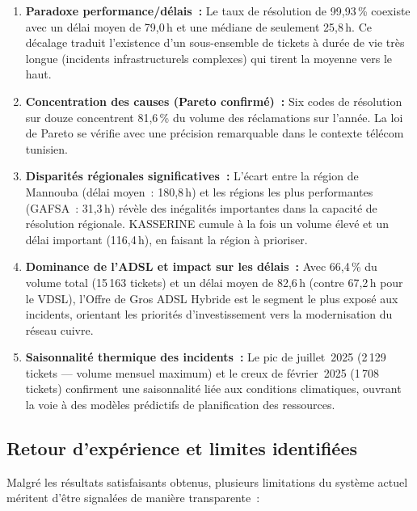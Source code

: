 \documentclass[10pt,a4paper]{report}
\begin{document}
\begin{enumerate}[leftmargin=*, label=\textbf{\arabic*.}, itemsep=8pt]
  \item \textbf{Paradoxe performance/délais~:} Le taux de résolution de 99,93\,\% coexiste avec un délai moyen de 79,0\,h et une médiane de seulement 25,8\,h. Ce décalage traduit l'existence d'un sous-ensemble de tickets à durée de vie très longue (incidents infrastructurels complexes) qui tirent la moyenne vers le haut.

  \item \textbf{Concentration des causes (Pareto confirmé)~:} Six codes de résolution sur douze concentrent 81,6\,\% du volume des réclamations sur l'année. La loi de Pareto se vérifie avec une précision remarquable dans le contexte télécom tunisien.

  \item \textbf{Disparités régionales significatives~:} L'écart entre la région de Mannouba (délai moyen~: 180,8\,h) et les régions les plus performantes (GAFSA~: 31,3\,h) révèle des inégalités importantes dans la capacité de résolution régionale. KASSERINE cumule à la fois un volume élevé et un délai important (116,4\,h), en faisant la région à prioriser.

  \item \textbf{Dominance de l'ADSL et impact sur les délais~:} Avec 66,4\,\% du volume total (15\,163 tickets) et un délai moyen de 82,6\,h (contre 67,2\,h pour le VDSL), l'Offre de Gros ADSL Hybride est le segment le plus exposé aux incidents, orientant les priorités d'investissement vers la modernisation du réseau cuivre.

  \item \textbf{Saisonnalité thermique des incidents~:} Le pic de juillet~2025 (2\,129 tickets --- volume mensuel maximum) et le creux de février~2025 (1\,708 tickets) confirment une saisonnalité liée aux conditions climatiques, ouvrant la voie à des modèles prédictifs de planification des ressources.
\end{enumerate}

\subsection{Retour d'expérience et limites identifiées}

Malgré les résultats satisfaisants obtenus, plusieurs limitations du système actuel méritent d'être signalées de manière transparente~:
\end{document}
